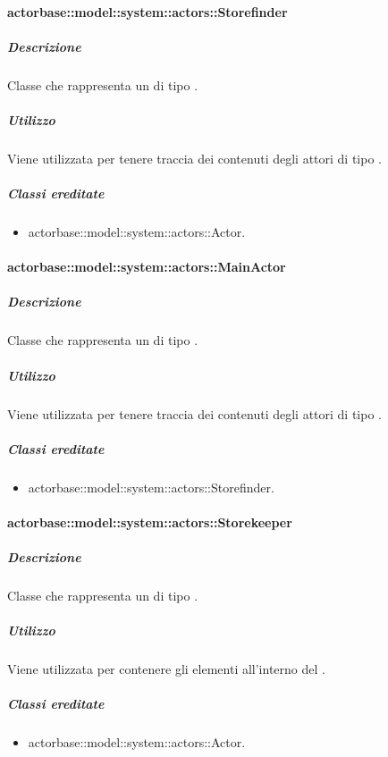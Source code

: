 \documentclass{scalatekids-article}
\begin{document}
\paragraph{actorbase::model::system::actors::Storefinder}

\subparagraph{Descrizione}

Classe che rappresenta un  di tipo .

\subparagraph{Utilizzo}

Viene utilizzata per tenere traccia dei contenuti degli attori di tipo
.

\subparagraph{Classi ereditate}

\begin{itemize}
\item actorbase::model::system::actors::Actor.
\end{itemize}

\paragraph{actorbase::model::system::actors::MainActor}

\subparagraph{Descrizione}

Classe che rappresenta un  di tipo .

\subparagraph{Utilizzo}

Viene utilizzata per tenere traccia dei contenuti degli attori di tipo
.

\subparagraph{Classi ereditate}

\begin{itemize}
\item actorbase::model::system::actors::Storefinder.
\end{itemize}

\paragraph{actorbase::model::system::actors::Storekeeper}

\subparagraph{Descrizione}

Classe che rappresenta un  di tipo .

\subparagraph{Utilizzo}

Viene utilizzata per contenere gli elementi all'interno del .

\subparagraph{Classi ereditate}

\begin{itemize}
\item actorbase::model::system::actors::Actor.
\end{itemize}
\end{document}
